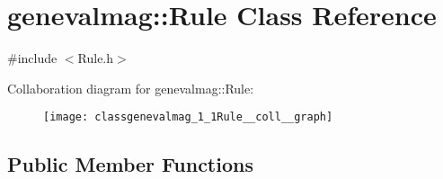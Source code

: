 \hypertarget{classgenevalmag_1_1Rule}{
\section{genevalmag::Rule Class Reference}
\label{classgenevalmag_1_1Rule}
}


{\ttfamily \#include $<$Rule.h$>$}



Collaboration diagram for genevalmag::Rule:\nopagebreak
\begin{figure}[H]
\begin{center}
\leavevmode
\texttt{[image: classgenevalmag\_1\_1Rule\_\_coll\_\_graph]}
\end{center}
\end{figure}
\subsection*{Public Member Functions}
